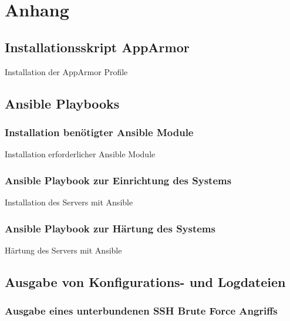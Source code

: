 \section{Anhang}

\subsection{Installationsskript AppArmor}

\begin{listing}[ht]{}
    \caption{Installation der AppArmor Profile}
    \label{listing:installation_apparmor}
\end{listing}

\newpage
\subsection{Ansible Playbooks}

\subsubsection{Installation benötigter Ansible Module}
\begin{listing}
    \caption{Installation erforderlicher Ansible Module}
    \label{listing:ansible_module_installation}
\end{listing}


\subsubsection{Ansible Playbook zur Einrichtung des Systems}
\begin{longlisting}
    \caption{Installation des Servers mit Ansible}
    \label{listing:ansible_playbook}
\end{longlisting}

\subsubsection{Ansible Playbook zur Härtung des Systems}
\begin{longlisting}
    \caption{Härtung des Servers mit Ansible}
    \label{listing:hardening}
\end{longlisting}

\subsection{Ausgabe von Konfigurations- und Logdateien}

\subsubsection{Ausgabe eines unterbundenen SSH Brute Force Angriffs}
\inputminted[breaklines=true,firstline=34, lastline=42]{text}{code/output/sshguard.txt}\label{listing:sshguard_log}
